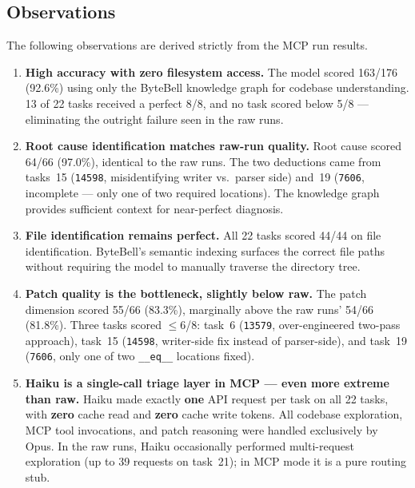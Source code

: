 \subsection{Observations}\label{sec:mcp-obs}

The following observations are derived strictly from the MCP run results.

\begin{enumerate}

\item \textbf{High accuracy with zero filesystem access.}
      The model scored 163/176 (92.6\%) using only the ByteBell
      knowledge graph for codebase understanding.  13 of 22 tasks
      received a perfect 8/8, and no task scored below 5/8 ---
      eliminating the outright failure seen in the raw runs.

\item \textbf{Root cause identification matches raw-run quality.}
      Root cause scored 64/66 (97.0\%), identical to the raw runs.
      The two deductions came from tasks~15 (\texttt{14598},
      misidentifying writer vs.\ parser side) and~19 (\texttt{7606},
      incomplete --- only one of two required locations).
      The knowledge graph provides sufficient context for near-perfect
      diagnosis.

\item \textbf{File identification remains perfect.}
      All 22 tasks scored 44/44 on file identification.
      ByteBell's semantic indexing surfaces the correct file paths
      without requiring the model to manually traverse the directory
      tree.

\item \textbf{Patch quality is the bottleneck, slightly below raw.}
      The patch dimension scored 55/66 (83.3\%), marginally above
      the raw runs' 54/66 (81.8\%).
      Three tasks scored $\le$6/8: task~6 (\texttt{13579},
      over-engineered two-pass approach), task~15 (\texttt{14598},
      writer-side fix instead of parser-side), and task~19
      (\texttt{7606}, only one of two \texttt{\_\_eq\_\_} locations
      fixed).

\item \textbf{Haiku is a single-call triage layer in MCP --- even
      more extreme than raw.}
      Haiku made exactly \textbf{one} API request per task on all 22
      tasks, with \textbf{zero} cache read and \textbf{zero} cache write
      tokens.  All codebase exploration, MCP tool invocations, and patch
      reasoning were handled exclusively by Opus.  In the raw runs,
      Haiku occasionally performed multi-request exploration (up to 39
      requests on task~21); in MCP mode it is a pure routing stub.


\end{enumerate}
